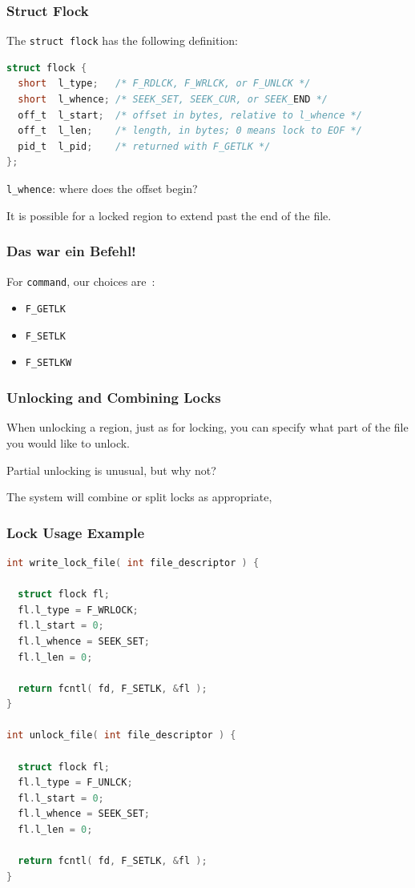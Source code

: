 \begin{frame}[fragile]
	\frametitle{Struct Flock}

	The \texttt{struct flock} has the following definition:
	\begin{lstlisting}[language=C]
struct flock {
  short  l_type;   /* F_RDLCK, F_WRLCK, or F_UNLCK */
  short  l_whence; /* SEEK_SET, SEEK_CUR, or SEEK_END */
  off_t  l_start;  /* offset in bytes, relative to l_whence */
  off_t  l_len;    /* length, in bytes; 0 means lock to EOF */
  pid_t  l_pid;    /* returned with F_GETLK */
};
\end{lstlisting}

	\texttt{l\_whence}: where does the offset begin?

	It is possible for a locked region to extend past the end of the file.

\end{frame}


\begin{frame}
	\frametitle{Das war ein Befehl!}

	For \texttt{command}, our choices are~\cite{apunix}:
	\begin{itemize}
		\item \texttt{F\_GETLK}
		\item \texttt{F\_SETLK}
		\item \texttt{F\_SETLKW}
	\end{itemize}

\end{frame}


\begin{frame}
	\frametitle{Unlocking and Combining Locks}

	When unlocking a region, just as for locking, you can specify what part of the file you would like to unlock.

	Partial unlocking is unusual, but why not?

	The system will combine or split locks as appropriate,


\end{frame}

\begin{frame}[fragile]
	\frametitle{Lock Usage Example}

	\begin{lstlisting}[language=C]
int write_lock_file( int file_descriptor ) {

  struct flock fl;
  fl.l_type = F_WRLOCK;
  fl.l_start = 0;
  fl.l_whence = SEEK_SET;
  fl.l_len = 0;
  
  return fcntl( fd, F_SETLK, &fl );
}

int unlock_file( int file_descriptor ) {

  struct flock fl;
  fl.l_type = F_UNLCK;
  fl.l_start = 0;
  fl.l_whence = SEEK_SET;
  fl.l_len = 0;
  
  return fcntl( fd, F_SETLK, &fl );
}
\end{lstlisting}


\end{frame}

